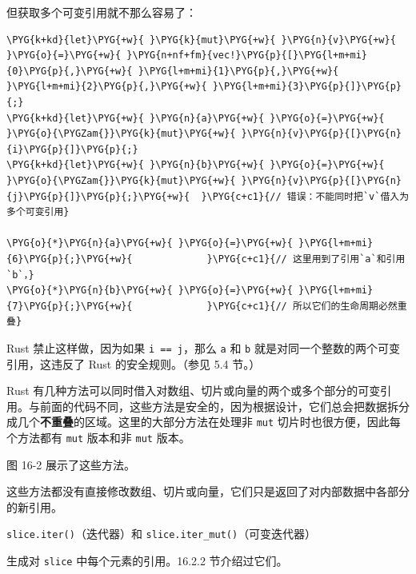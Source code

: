 但获取多个可变引用就不那么容易了：

\begin{Verbatim}[commandchars=\\\{\},breaklines=true,breakanywhere=true,fontsize=\codefont,xleftmargin=17bp]
\PYG{k+kd}{let}\PYG{+w}{ }\PYG{k}{mut}\PYG{+w}{ }\PYG{n}{v}\PYG{+w}{ }\PYG{o}{=}\PYG{+w}{ }\PYG{n+nf+fm}{vec!}\PYG{p}{[}\PYG{l+m+mi}{0}\PYG{p}{,}\PYG{+w}{ }\PYG{l+m+mi}{1}\PYG{p}{,}\PYG{+w}{ }\PYG{l+m+mi}{2}\PYG{p}{,}\PYG{+w}{ }\PYG{l+m+mi}{3}\PYG{p}{]}\PYG{p}{;}
\PYG{k+kd}{let}\PYG{+w}{ }\PYG{n}{a}\PYG{+w}{ }\PYG{o}{=}\PYG{+w}{ }\PYG{o}{\PYGZam{}}\PYG{k}{mut}\PYG{+w}{ }\PYG{n}{v}\PYG{p}{[}\PYG{n}{i}\PYG{p}{]}\PYG{p}{;}
\PYG{k+kd}{let}\PYG{+w}{ }\PYG{n}{b}\PYG{+w}{ }\PYG{o}{=}\PYG{+w}{ }\PYG{o}{\PYGZam{}}\PYG{k}{mut}\PYG{+w}{ }\PYG{n}{v}\PYG{p}{[}\PYG{n}{j}\PYG{p}{]}\PYG{p}{;}\PYG{+w}{  }\PYG{c+c1}{// 错误：不能同时把`v`借入为多个可变引用}

\PYG{o}{*}\PYG{n}{a}\PYG{+w}{ }\PYG{o}{=}\PYG{+w}{ }\PYG{l+m+mi}{6}\PYG{p}{;}\PYG{+w}{             }\PYG{c+c1}{// 这里用到了引用`a`和引用`b`，}
\PYG{o}{*}\PYG{n}{b}\PYG{+w}{ }\PYG{o}{=}\PYG{+w}{ }\PYG{l+m+mi}{7}\PYG{p}{;}\PYG{+w}{             }\PYG{c+c1}{// 所以它们的生命周期必然重叠}
\end{Verbatim}

Rust 禁止这样做，因为如果 \texttt{i == j}，那么 \texttt{a} 和 \texttt{b} 就是对同一个整数的两个可变引用，这违反了 Rust 的安全规则。（参见 5.4 节。）

Rust 有几种方法可以同时借入对数组、切片或向量的两个或多个部分的可变引用。与前面的代码不同，这些方法是安全的，因为根据设计，它们总会把数据拆分成几个\textbf{不重叠}的区域。这里的大部分方法在处理非 \texttt{mut} 切片时也很方便，因此每个方法都有 \texttt{mut} 版本和非 \texttt{mut} 版本。

图 16-2 展示了这些方法。


这些方法都没有直接修改数组、切片或向量，它们只是返回了对内部数据中各部分的新引用。

\begin{myNote}
\texttt{slice.iter()}（迭代器）和 \texttt{slice.iter\_mut()}（可变迭代器）
\end{myNote}

生成对 \texttt{slice} 中每个元素的引用。16.2.2 节介绍过它们。


